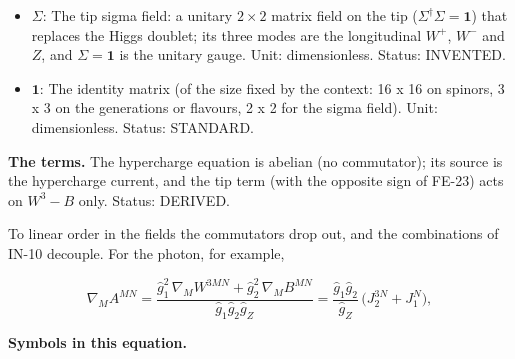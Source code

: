 \documentclass[
  10pt,
]{article}
\begin{document}
\begin{itemize}
  indices the components along the observable directions. Unit: GeV
  (field), \(\mathrm{GeV}^{2}\) (field strength). Status: ASSUMED.
\item
  \(\Sigma\): The tip sigma field: a unitary \(2 \times 2\) matrix field
  on the tip (\(\Sigma^\dagger\Sigma = \mathbf{1}\)) that replaces the
  Higgs doublet; its three modes are the longitudinal \(W^+\), \(W^-\)
  and \(Z\), and \(\Sigma = \mathbf{1}\) is the unitary gauge. Unit:
  dimensionless. Status: INVENTED.
\item
  \(\mathbf{1}\): The identity matrix (of the size fixed by the context:
  16 x 16 on spinors, 3 x 3 on the generations or flavours, 2 x 2 for
  the sigma field). Unit: dimensionless. Status: STANDARD.
\end{itemize}

\textbf{The terms.} The hypercharge equation is abelian (no commutator);
its source is the hypercharge current, and the tip term (with the
opposite sign of FE-23) acts on \(W^3 - B\) only. Status: DERIVED.

To linear order in the fields the commutators drop out, and the
combinations of IN-10 decouple. For the photon, for example,

\[
\nabla_MA^{MN} = \frac{\hat g_1^2\,\nabla_MW^{3MN} + \hat g_2^2\,\nabla_MB^{MN}}{\hat g_1\hat g_2\hat g_Z}
 = \frac{\hat g_1\hat g_2}{\hat g_Z}\,\big(J_2^{3N} + J_1^N\big),
\]

\textbf{Symbols in this equation.}
\end{document}
